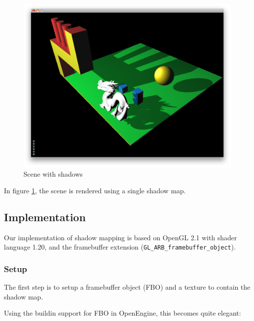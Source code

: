 \begin{figure}[h]
  \centering
  \includegraphics[width=\textwidth]{gfx/scenewithshadow}  
  \caption{Scene with shadows}
  \label{fig:sceneshadow}
\end{figure}

In figure \ref{fig:sceneshadow}, the scene is rendered using a single
shadow map.

\newpage


\subsection{Implementation}

Our implementation of shadow mapping is based on OpenGL 2.1 with
shader language 1.20, and the framebuffer extension
(\texttt{GL\_ARB\_framebuffer\_object}).



\subsubsection*{Setup}

The first step is to setup a framebuffer object (FBO) and a texture to
contain the shadow map.

Using the buildin support for FBO in OpenEngine, this becomes quite elegant:

